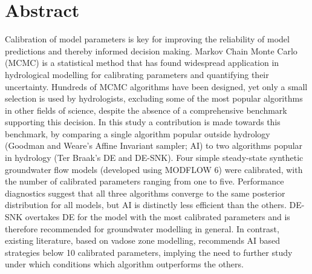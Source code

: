 \section*{Abstract}\label{abstract}
Calibration of model parameters is key for improving the reliability of model predictions and thereby informed decision making. Markov Chain Monte Carlo (MCMC) is a statistical method that has found widespread application in hydrological modelling for calibrating parameters and quantifying their uncertainty. Hundreds of MCMC algorithms have been designed, yet only a small selection is used by hydrologists, excluding some of the most popular algorithms in other fields of science, despite the absence of a comprehensive benchmark supporting this decision. In this study a contribution is made towards this benchmark, by comparing a single algorithm popular outside hydrology (Goodman and Weare’s Affine Invariant sampler; AI) to two algorithms popular in hydrology (Ter Braak’s DE and DE-SNK). Four simple steady-state synthetic groundwater flow models (developed using MODFLOW 6) were calibrated, with the number of calibrated parameters ranging from one to five. Performance diagnostics suggest that all three algorithms converge to the same posterior distribution for all models, but AI is distinctly less efficient than the others. DE-SNK overtakes DE for the model with the most calibrated parameters and is therefore recommended for groundwater modelling in general. In contrast, existing literature, based on vadose zone modelling, recommends AI based strategies below 10 calibrated parameters, implying the need to further study under which conditions which algorithm outperforms the others. 






